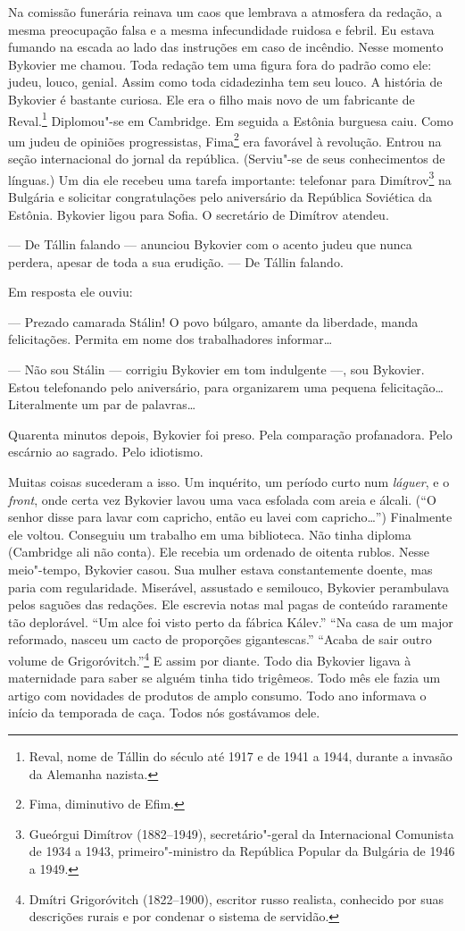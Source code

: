 Na comissão funerária reinava um caos que lembrava a atmosfera da
redação, a mesma preocupação falsa e a mesma infecundidade ruidosa e
febril. Eu estava fumando na escada ao lado das instruções em caso de
incêndio. Nesse momento Bykovier me chamou. Toda redação tem uma figura
fora do padrão como ele: judeu, louco, genial. Assim como toda
cidadezinha tem seu louco. A história de Bykovier é bastante curiosa.
Ele era o filho mais novo de um fabricante de Reval.\footnote{Reval,
  nome de Tállin do século  até 1917 e de 1941 a 1944, durante a
  invasão da Alemanha nazista.} Diplomou"-se em Cambridge. Em seguida a
Estônia burguesa caiu. Como um judeu de opiniões progressistas,
Fima\footnote{Fima, diminutivo de Efim.} era favorável à revolução.
Entrou na seção internacional do jornal da república. (Serviu"-se de seus
conhecimentos de línguas.) Um dia ele recebeu uma tarefa importante:
telefonar para Dimítrov\footnote{Gueórgui Dimítrov (1882--1949),
  secretário"-geral da Internacional Comunista de 1934 a 1943,
  primeiro"-ministro da República Popular da Bulgária de 1946 a 1949.} na
Bulgária e solicitar congratulações pelo aniversário da República
Soviética da Estônia. Bykovier ligou para Sofia. O secretário de
Dimítrov atendeu.

--- De Tállin falando --- anunciou Bykovier com o acento judeu que nunca
perdera, apesar de toda a sua erudição. --- De Tállin falando.

Em resposta ele ouviu:

--- Prezado camarada Stálin! O povo búlgaro, amante da liberdade, manda
felicitações. Permita em nome dos trabalhadores informar\ldots{}

--- Não sou Stálin --- corrigiu Bykovier em tom indulgente ---, sou
Bykovier. Estou telefonando pelo aniversário, para organizarem uma
pequena felicitação\ldots{} Literalmente um par de palavras\ldots{}

Quarenta minutos depois, Bykovier foi preso. Pela comparação
profanadora. Pelo escárnio ao sagrado. Pelo idiotismo.

Muitas coisas sucederam a isso. Um inquérito, um período curto num
\emph{láguer}, e o \emph{front}, onde certa vez Bykovier lavou uma vaca
esfolada com areia e álcali. (``O senhor disse para lavar com capricho,
então eu lavei com capricho\ldots{}'') Finalmente ele voltou. Conseguiu um
trabalho em uma biblioteca. Não tinha diploma (Cambridge ali não conta).
Ele recebia um ordenado de oitenta rublos. Nesse meio"-tempo, Bykovier
casou. Sua mulher estava constantemente doente, mas paria com
regularidade. Miserável, assustado e semilouco, Bykovier perambulava
pelos saguões das redações. Ele escrevia notas mal pagas de conteúdo
raramente tão deplorável. ``Um alce foi visto perto da fábrica Kálev.''
``Na casa de um major reformado, nasceu um cacto de proporções
gigantescas.'' ``Acaba de sair outro volume de Grigoróvitch.''\footnote{Dmítri
  Grigoróvitch (1822--1900), escritor russo realista, conhecido por suas
  descrições rurais e por condenar o sistema de servidão.} E assim por
diante. Todo dia Bykovier ligava à maternidade para saber se alguém
tinha tido trigêmeos. Todo mês ele fazia um artigo com novidades de
produtos de amplo consumo. Todo ano informava o início da temporada de
caça. Todos nós gostávamos dele.

